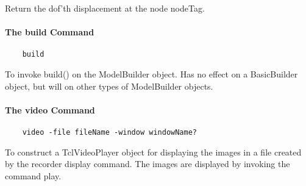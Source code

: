 \documentclass[12pt]{article}
\begin{document}
\noindent Return the dof'th displacement at the node nodeTag.


\paragraph {The build Command}

{\sf\small
\begin{verbatim}
    build
\end{verbatim}
}

\noindent To invoke build() on the ModelBuilder object. Has no effect
on a BasicBuilder object, but will on other types of ModelBuilder objects.

\paragraph {The video Command}

{\sf\small
\begin{verbatim}
    video -file fileName -window windowName?
\end{verbatim}
}

\noindent To construct a TclVideoPlayer object for displaying the images in a file
created by the recorder display command. The images are displayed by invoking the 
command \p play.
\end{document}
